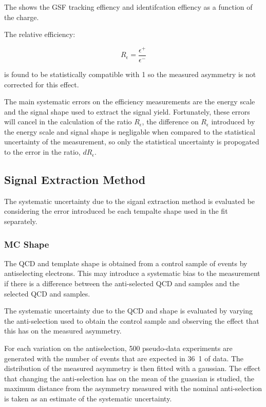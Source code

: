 The  shows the GSF tracking effiency and identifcation 
effiency as a function of the charge.

The relative efficiency: 

\begin{equation}
R_\epsilon  =  \frac{\epsilon^+}{\epsilon^-}
\end{equation}

is found to be statistically compatible with 1 so the measured asymmetry is not
corrected for this effect.

The main systematic errors on the efficiency measurements are the energy scale
and the signal shape used to extract the signal yield. Fortunately, these
errors will cancel in the calculation of the ratio $R_\epsilon$, the difference
on  $R_\epsilon$ introduced by the energy scale and signal shape is negligable
when compared to the statistical uncertainty of the measurement, so only the
statistical uncertainty is propogated to the error in the ratio,
$dR_\epsilon$.

\subsection{Signal Extraction Method}

The systematic uncertainty due to the siganl extraction method is evaluated be
considering the error introduced be each \ETm tempalte shape used in the fit
separately.

\subsubsection{\ac{MC} \ETm Shape}

The \ac{QCD} and \gjet \ETm template shape is obtained from a control sample of
events by antiselecting electrons. This may introduce a systematic bias to the
measurement if there is a difference between the anti-selected \ac{QCD} and \gjet
\ETm samples and the selected \ac{QCD} and \gjet samples.

The systematic uncertainty due to the \ac{QCD} and \gjet \ETm shape is evaluated by
varying the anti-selection used to obtain the control sample and observing the
effect that this has on the measured asymmetry.

For each variation on the antiselection, 500 pseudo-data experiments are
generated with the number of events that are expected in \unit{36.1}{\invpb} of
data. The distribution of the measured asymmetry is then fitted with a
gaussian.
The effect that changing the anti-selection has on the mean of the guassian is
studied, the maximum distance from the asymmetry measured with the nominal
anti-selection is taken as an estimate of the systematic uncertainty.

